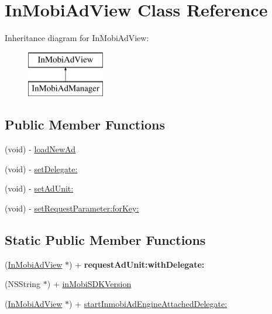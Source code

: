 \hypertarget{interface_in_mobi_ad_view}{
\section{InMobiAdView Class Reference}
\label{interface_in_mobi_ad_view}
}
Inheritance diagram for InMobiAdView:\begin{figure}[H]
\begin{center}
\leavevmode
\includegraphics[height=2.000000cm]{interface_in_mobi_ad_view}
\end{center}
\end{figure}
\subsection*{Public Member Functions}
\begin{DoxyCompactItemize}
\item 
(void) -\/ \hyperlink{interface_in_mobi_ad_view_aaec4618fb3a9950651b21d73dc766a30}{loadNewAd}
\item 
(void) -\/ \hyperlink{interface_in_mobi_ad_view_a946a3666679d8b3c3f422f1e687cef87}{setDelegate:}
\item 
(void) -\/ \hyperlink{interface_in_mobi_ad_view_a524ed941db8981a46fe1666bac583231}{setAdUnit:}
\item 
(void) -\/ \hyperlink{interface_in_mobi_ad_view_aa1c9c038348d48b0a26d380016dcdd86}{setRequestParameter:forKey:}
\end{DoxyCompactItemize}
\subsection*{Static Public Member Functions}
\begin{DoxyCompactItemize}
\item 
\hypertarget{interface_in_mobi_ad_view_a5386b4f7ff4f2e07a08018d3eacffcd6}{
(\hyperlink{interface_in_mobi_ad_view}{InMobiAdView} $\ast$) + {\bfseries requestAdUnit:withDelegate:}}
\label{interface_in_mobi_ad_view_a5386b4f7ff4f2e07a08018d3eacffcd6}

\item 
(NSString $\ast$) + \hyperlink{interface_in_mobi_ad_view_a9aad18b450e42597ef3112c3b112f01f}{inMobiSDKVersion}
\item 
(\hyperlink{interface_in_mobi_ad_view}{InMobiAdView} $\ast$) + \hyperlink{interface_in_mobi_ad_view_a7d02b36bb9b3b12dba0101973caac076}{startInmobiAdEngineAttachedDelegate:}
\end{DoxyCompactItemize}


